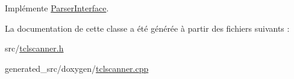 Implémente \hyperlink{class_parser_interface_a72478f87ead5fde10d7d6bbe32a73024}{Parser\+Interface}.



La documentation de cette classe a été générée à partir des fichiers suivants \+:\begin{DoxyCompactItemize}
\item 
src/\hyperlink{tclscanner_8h}{tclscanner.\+h}\item 
generated\+\_\+src/doxygen/\hyperlink{tclscanner_8cpp}{tclscanner.\+cpp}\end{DoxyCompactItemize}
